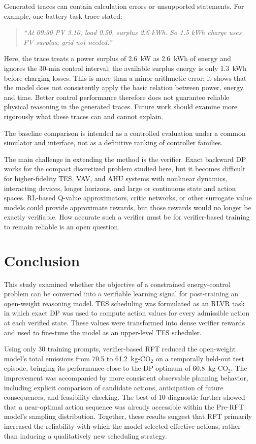 \documentclass[11pt]{article}
\begin{document}
Generated traces can contain calculation errors or unsupported statements. For example, one battery-task trace stated:
\begin{quote}
\small\itshape
``At 09:30 PV 3.10, load 0.50, surplus 2.6 kWh. So 1.5 kWh charge uses\\
PV surplus; grid not needed.''
\end{quote}
Here, the trace treats a power surplus of 2.6~kW as 2.6~kWh of energy and ignores the 30-min control interval; the available surplus energy is only 1.3~kWh before charging losses. This is more than a minor arithmetic error: it shows that the model does not consistently apply the basic relation between power, energy, and time. Better control performance therefore does not guarantee reliable physical reasoning in the generated traces. Future work should examine more rigorously what these traces can and cannot explain.

The baseline comparison is intended as a controlled evaluation under a common simulator and interface, not as a definitive ranking of controller families.

The main challenge in extending the method is the verifier. Exact backward DP works for the compact discretized problem studied here, but it becomes difficult for higher-fidelity TES, VAV, and AHU systems with nonlinear dynamics, interacting devices, longer horizons, and large or continuous state and action spaces. RL-based Q-value approximators, critic networks, or other surrogate value models could provide approximate rewards, but those rewards would no longer be exactly verifiable. How accurate such a verifier must be for verifier-based training to remain reliable is an open question.

\section{Conclusion}\label{sec:conclusion}
This study examined whether the objective of a constrained energy-control problem can be converted into a verifiable learning signal for post-training an open-weight reasoning model. TES scheduling was formulated as an RLVR task in which exact DP was used to compute action values for every admissible action at each verified state. These values were transformed into dense verifier rewards and used to fine-tune the model as an upper-level TES scheduler.

Using only 30 training prompts, verifier-based RFT reduced the open-weight model's total emissions from 70.5 to 61.2~kg-CO$_2$ on a temporally held-out test episode, bringing its performance close to the DP optimum of 60.8~kg-CO$_2$. The improvement was accompanied by more consistent observable planning behavior, including explicit comparison of candidate actions, anticipation of future consequences, and feasibility checking. The best-of-10 diagnostic further showed that a near-optimal action sequence was already accessible within the Pre-RFT model's sampling distribution. Together, these results suggest that RFT primarily increased the reliability with which the model selected effective actions, rather than inducing a qualitatively new scheduling strategy.
\end{document}
